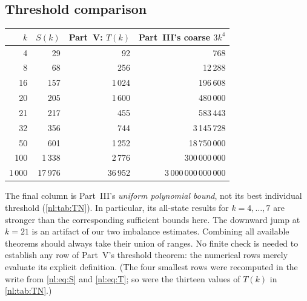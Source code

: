 \documentclass[11pt,a4paper]{article}
\numberwithin{equation}{section}
\theoremstyle{definition}
\theoremstyle{remark}
\begin{document}
\subsection{Threshold comparison}
\begin{center}
\begin{tabular}{@{}rrrr@{}}
\toprule
$k$ & $S(k)$ & Part~V: $T(k)$ & Part~III's coarse $3k^4$\\\midrule
4&29&92&768\\
8&68&256&12\,288\\
16&157&1\,024&196\,608\\
20&205&1\,600&480\,000\\
21&217&455&583\,443\\
32&356&744&3\,145\,728\\
50&601&1\,252&18\,750\,000\\
100&1\,338&2\,776&300\,000\,000\\
1\,000&17\,976&36\,952&3\,000\,000\,000\,000\\
\bottomrule
\end{tabular}
\end{center}
The final column is Part~III's \emph{uniform polynomial bound}, not
its best individual threshold (\cref{nl:tab:TN}). In particular, its all-state results for
$k=4,\ldots,7$ are stronger than the corresponding sufficient bounds here.
The downward jump at $k=21$ is an artifact of our two imbalance estimates.
Combining all available theorems should always take their union of ranges.
No finite check is needed to establish any row of Part~V's threshold
theorem: the numerical rows merely evaluate its explicit definition.
(The four smallest rows were recomputed in the write from \eqref{nl:eq:S}
and \eqref{nl:eq:T}; so were the thirteen values of $T(k)$ in \cref{nl:tab:TN}.)
\end{document}
